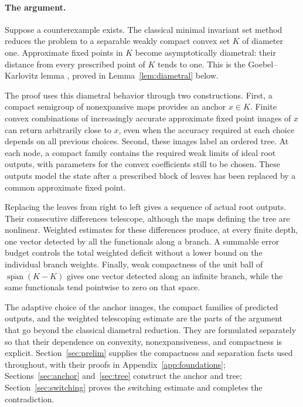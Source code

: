 \paragraph{The argument.}
Suppose a counterexample exists. The classical minimal invariant set
method reduces the problem to a separable weakly compact convex set
$K$ of diameter one. Approximate fixed points in $K$ become asymptotically
diametral: their distance from every prescribed point of $K$ tends to one.
This is the Goebel--Karlovitz lemma
\cite{Goebel1975,Karlovitz1976}, proved in
Lemma~\ref{lem:diametral} below.

The proof uses this diametral behavior through two constructions.
First, a compact semigroup of nonexpansive maps provides an anchor
$x\in K$. Finite convex combinations of increasingly accurate
approximate fixed point images of $x$ can return arbitrarily close
to $x$, even when the accuracy required at each choice depends on
all previous choices. Second, these images label an ordered tree.
At each node, a compact family contains the required weak limits of
ideal root outputs, with parameters for the convex coefficients still
to be chosen. These outputs model the state after a prescribed block
of leaves has been replaced by a common approximate fixed point.

Replacing the leaves from right to left gives a sequence of actual
root outputs. Their consecutive differences telescope, although
the maps defining the tree are nonlinear. Weighted estimates for
these differences produce, at every finite depth, one vector
detected by all the functionals along a branch. A summable error
budget controls the total weighted deficit without a lower bound
on the individual branch weights. Finally, weak compactness of the
unit ball of $\overline{\operatorname{span}}(K-K)$ gives one vector
detected along an infinite branch, while the same functionals tend
pointwise to zero on that space.

The adaptive choice of the anchor images, the compact families of
predicted outputs, and the weighted telescoping estimate are the
parts of the argument that go beyond the classical diametral
reduction. They are formulated separately so that their dependence
on convexity, nonexpansiveness, and compactness is explicit.
Section~\ref{sec:prelim} supplies the compactness and separation
facts used throughout, with their proofs in
Appendix~\ref{app:foundations}; Sections~\ref{sec:anchor} and~\ref{sec:tree}
construct the anchor and tree; Section~\ref{sec:switching} proves
the switching estimate and completes the contradiction.
